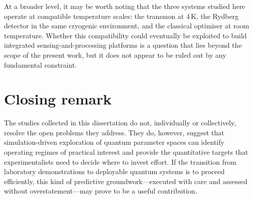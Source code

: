 At a broader level, it may be worth noting that the three systems
studied here operate at compatible temperature scales: the transmon
at 4\,K, the Rydberg detector in the same cryogenic environment, and
the classical optimiser at room temperature.  Whether this
compatibility could eventually be exploited to build integrated
sensing-and-processing platforms is a question that lies beyond the
scope of the present work, but it does not appear to be ruled out
by any fundamental constraint.

\section{Closing remark}

The studies collected in this dissertation do not, individually or
collectively, resolve the open problems they address.  They do,
however, suggest that simulation-driven exploration of quantum
parameter spaces can identify operating regimes of practical interest
and provide the quantitative targets that experimentalists need to
decide where to invest effort.  If the transition from laboratory
demonstrations to deployable quantum systems is to proceed
efficiently, this kind of predictive groundwork---executed with care
and assessed without overstatement---may prove to be a useful
contribution.
